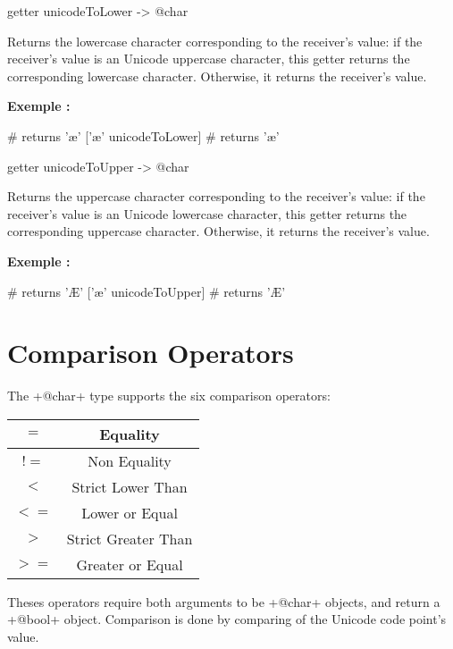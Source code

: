 
\begin{galgas}
getter unicodeToLower -> @char
\end{galgas}

Returns the lowercase character corresponding to the receiver's value: if the receiver's value is an Unicode uppercase character, this getter returns the corresponding lowercase character. Otherwise, it returns the receiver's value.

\textbf{Exemple :}
\begin{galgas}
['Æ' unicodeToLower] # returns 'æ'
['æ' unicodeToLower] # returns 'æ'
\end{galgas}





\begin{galgas}
getter unicodeToUpper -> @char
\end{galgas}

Returns the uppercase character corresponding to the receiver's value: if the receiver's value is an Unicode lowercase character, this getter returns the corresponding uppercase character. Otherwise, it returns the receiver's value.

\textbf{Exemple :}
\begin{galgas}
['Æ' unicodeToUpper] # returns 'Æ'
['æ' unicodeToUpper] # returns 'Æ'
\end{galgas}





\section{Comparison Operators}

The \ggs+@char+ type supports the six comparison operators:\newline

\begin{tabular}{|c|c|}
\hline
$=$ & Equality \\
\hline
$!=$ & Non Equality \\
\hline
$<$  & Strict Lower Than \\
\hline
$<=$  & Lower or Equal \\
\hline
$>$  & Strict Greater Than \\
\hline
$>=$  & Greater or Equal \\
\hline
\end{tabular}

Theses operators require both arguments to be \ggs+@char+ objects, and return a \ggs+@bool+ object. Comparison is done by comparing of the Unicode code point's value.


